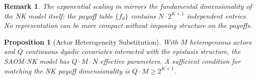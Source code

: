 \documentclass[12pt]{article}
\newtheorem{proposition}{Proposition}
\newtheorem{remark}{Remark}
\begin{document}
\begin{remark}
The exponential scaling in  mirrors the fundamental
dimensionality of the NK model itself: the payoff table $\{f_d\}$ contains
$N \cdot 2^{K+1}$ independent entries. No representation can be more compact
without imposing structure on the payoffs.
\end{remark}

\begin{proposition}[Actor Heterogeneity Substitution]
\label{prop:heterogeneity}
With $M$ heterogeneous actors and $Q$ continuous dyadic covariates interacted
with the epistasis structure, the SAOM-NK model has $Q \cdot M \cdot N$
effective parameters. A sufficient condition for matching the NK payoff
dimensionality is $Q \cdot M \geq 2^{K+1}$.
\end{proposition}
\end{document}
